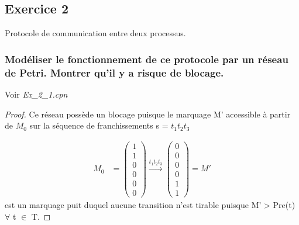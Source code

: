 \documentclass[french]{article}
\begin{document}
\subsection{Exercice 2}
Protocole de communication entre deux processus.
\subsubsection{Modéliser le fonctionnement de ce protocole par un réseau de Petri. Montrer qu’il y a risque de 
blocage.}
Voir \textit{Ex\_2\_1.cpn}
\begin{proof}
Ce réseau possède un blocage puisque le marquage M' accessible à partir de $M_0$ sur la séquence de franchissements s = $t_1 
t_2 t_3$

\begin{align*}
M_0 &= \begin{pmatrix} 
	1 \\ 
	1 \\ 
	0 \\
	0 \\
	0 \\
	0   
\end{pmatrix} \xrightarrow{t_1 t_2 t_3} 
\begin{pmatrix} 
	0 \\ 
	0 \\ 
	0 \\
	0 \\
	1 \\
	1   
\end{pmatrix} = M'
\end{align*}
est un marquage puit duquel aucune transition n'est tirable puisque M' > Pre(t) $\forall$ t $\in$ T.
\end{proof}
\end{document}
